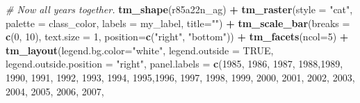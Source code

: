 \documentclass[
]{article}
\newenvironment{Shaded}{\begin{snugshade}}{\end{snugshade}}
\newcommand{\AttributeTok}[1]{\textcolor[rgb]{0.13,0.29,0.53}{#1}}
\newcommand{\CommentTok}[1]{\textcolor[rgb]{0.56,0.35,0.01}{\textit{#1}}}
\newcommand{\ConstantTok}[1]{\textcolor[rgb]{0.56,0.35,0.01}{#1}}
\newcommand{\DecValTok}[1]{\textcolor[rgb]{0.00,0.00,0.81}{#1}}
\newcommand{\FunctionTok}[1]{\textcolor[rgb]{0.13,0.29,0.53}{\textbf{#1}}}
\newcommand{\NormalTok}[1]{#1}
\newcommand{\SpecialCharTok}[1]{\textcolor[rgb]{0.81,0.36,0.00}{\textbf{#1}}}
\newcommand{\StringTok}[1]{\textcolor[rgb]{0.31,0.60,0.02}{#1}}
\begin{document}
\begin{Shaded}
\begin{Highlighting}[]
\CommentTok{\# Now all years together.}
\FunctionTok{tm\_shape}\NormalTok{(r85a22n\_ag) }\SpecialCharTok{+}
  \FunctionTok{tm\_raster}\NormalTok{(}\AttributeTok{style =} \StringTok{"cat"}\NormalTok{, }\AttributeTok{palette =}\NormalTok{ class\_color, }\AttributeTok{labels =}\NormalTok{ my\_label, }\AttributeTok{title=}\StringTok{""}\NormalTok{) }\SpecialCharTok{+} 
  \FunctionTok{tm\_scale\_bar}\NormalTok{(}\AttributeTok{breaks =} \FunctionTok{c}\NormalTok{(}\DecValTok{0}\NormalTok{, }\DecValTok{10}\NormalTok{), }\AttributeTok{text.size =} \DecValTok{1}\NormalTok{, }
               \AttributeTok{position=}\FunctionTok{c}\NormalTok{(}\StringTok{"right"}\NormalTok{, }\StringTok{"bottom"}\NormalTok{)) }\SpecialCharTok{+}
  \FunctionTok{tm\_facets}\NormalTok{(}\AttributeTok{ncol=}\DecValTok{5}\NormalTok{) }\SpecialCharTok{+} 
  \FunctionTok{tm\_layout}\NormalTok{(}\AttributeTok{legend.bg.color=}\StringTok{"white"}\NormalTok{, }\AttributeTok{legend.outside =} \ConstantTok{TRUE}\NormalTok{,}
            \AttributeTok{legend.outside.position =} \StringTok{"right"}\NormalTok{, }
            \AttributeTok{panel.labels =} \FunctionTok{c}\NormalTok{(}\StringTok{\textquotesingle{}1985\textquotesingle{}}\NormalTok{, }\StringTok{\textquotesingle{}1986\textquotesingle{}}\NormalTok{, }\StringTok{\textquotesingle{}1987\textquotesingle{}}\NormalTok{, }\StringTok{\textquotesingle{}1988\textquotesingle{}}\NormalTok{,}\StringTok{\textquotesingle{}1989\textquotesingle{}}\NormalTok{, }\StringTok{\textquotesingle{}1990\textquotesingle{}}\NormalTok{,}
                             \StringTok{\textquotesingle{}1991\textquotesingle{}}\NormalTok{,  }\StringTok{\textquotesingle{}1992\textquotesingle{}}\NormalTok{, }\StringTok{\textquotesingle{}1993\textquotesingle{}}\NormalTok{, }\StringTok{\textquotesingle{}1994\textquotesingle{}}\NormalTok{, }\StringTok{\textquotesingle{}1995\textquotesingle{}}\NormalTok{,}\StringTok{\textquotesingle{}1996\textquotesingle{}}\NormalTok{, }
                             \StringTok{\textquotesingle{}1997\textquotesingle{}}\NormalTok{, }\StringTok{\textquotesingle{}1998\textquotesingle{}}\NormalTok{,}
                             \StringTok{\textquotesingle{}1999\textquotesingle{}}\NormalTok{, }\StringTok{\textquotesingle{}2000\textquotesingle{}}\NormalTok{, }\StringTok{\textquotesingle{}2001\textquotesingle{}}\NormalTok{, }\StringTok{\textquotesingle{}2002\textquotesingle{}}\NormalTok{, }\StringTok{\textquotesingle{}2003\textquotesingle{}}\NormalTok{, }
                             \StringTok{\textquotesingle{}2004\textquotesingle{}}\NormalTok{, }\StringTok{\textquotesingle{}2005\textquotesingle{}}\NormalTok{, }\StringTok{\textquotesingle{}2006\textquotesingle{}}\NormalTok{, }\StringTok{\textquotesingle{}2007\textquotesingle{}}\NormalTok{,}

\end{Highlighting}
\end{Shaded}
\end{document}

